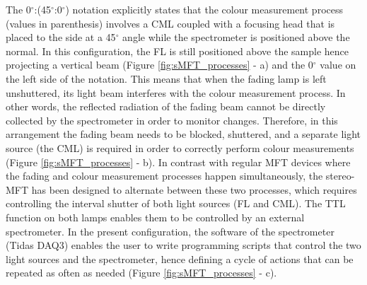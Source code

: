 The 0$^\circ$:(45$^\circ$:0$^\circ$) notation explicitly states that the colour measurement process (values in parenthesis) involves a \gls{CML} coupled with a focusing head that is placed to the side at a 45$^\circ$ angle while the spectrometer is positioned above the normal. In this configuration, the \gls{FL} is still positioned above the sample hence projecting a vertical beam (Figure \ref{fig:sMFT_processes} - a) and the 0$^\circ$ value on the left side of the notation. This means that when the fading lamp is left unshuttered, its light beam interferes with the colour measurement process. In other words, the reflected radiation of the fading beam cannot be directly collected by the spectrometer in order to monitor changes. Therefore, in this arrangement the fading beam needs to be blocked, \ie shuttered, and a separate light source (the \gls{CML}) is required in order to correctly perform colour measurements (Figure \ref{fig:sMFT_processes} - b). In contrast with regular \gls{MFT} devices where the fading and colour measurement processes happen simultaneously, the stereo-MFT has been designed to alternate between these two processes, which requires controlling the interval shutter of both light sources (\gls{FL} and \gls{CML}). The \gls{TTL} function on both lamps enables them to be controlled by an external spectrometer. In the present configuration, the software of the spectrometer (Tidas DAQ3) enables the user to write programming scripts that control the two light sources and the spectrometer, hence defining a cycle of actions that can be repeated as often as needed (Figure \ref{fig:sMFT_processes} - c).\\




